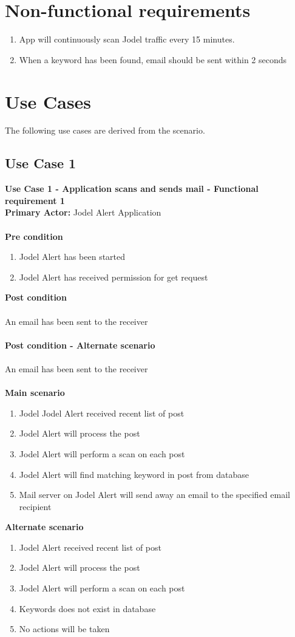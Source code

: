 \documentclass[a4paper,12pt]{article}
\begin{document}
\section{Non-functional requirements}
\begin{enumerate}
	\item App will continuously scan Jodel traffic every 15 minutes.
	\item When a keyword has been found, email should be sent within 2 seconds
\end{enumerate}
\clearpage
\section{Use Cases}
The following use cases are derived from the scenario.
\subsection{Use Case 1}
\textbf{Use Case 1 - Application scans and sends mail - Functional requirement 1}\\
\textbf{Primary Actor:}
Jodel Alert Application\\\\
\textbf{Pre condition}
\begin{enumerate}
	\item Jodel Alert has been started
	\item Jodel Alert has received permission for get request
\end{enumerate}
\textbf{Post condition}\\\\
An email has been sent to the receiver\\\\
\textbf{Post condition - Alternate scenario}\\\\
An email has been sent to the receiver\\\\
\textbf{Main scenario}
\begin{enumerate}
	\item Jodel Jodel Alert received recent list of post
	\item Jodel Alert will process the post
	\item Jodel Alert will perform a scan on each post
	\item Jodel Alert will find matching keyword in post from database 
	\item Mail server on Jodel Alert will send away an email to the specified email recipient
\end{enumerate}
\textbf{Alternate scenario}
\begin{enumerate}
	\item Jodel Alert received recent list of post
	\item Jodel Alert will process the post
	\item Jodel Alert will perform a scan on each post
	\item Keywords does not exist in database
	\item No actions will be taken
\end{enumerate}
\end{document}
